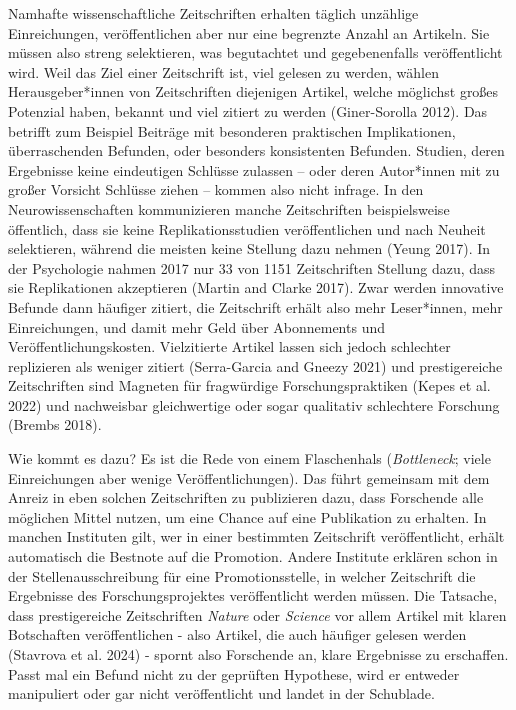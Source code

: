 \documentclass[
  letterpaper,
  DIV=11,
  numbers=noendperiod]{scrreprt}
\begin{document}
Namhafte wissenschaftliche Zeitschriften erhalten täglich unzählige
Einreichungen, veröffentlichen aber nur eine begrenzte Anzahl an
Artikeln. Sie müssen also streng selektieren, was begutachtet und
gegebenenfalls veröffentlicht wird. Weil das Ziel einer Zeitschrift ist,
viel gelesen zu werden, wählen Herausgeber*innen von Zeitschriften
diejenigen Artikel, welche möglichst großes Potenzial haben, bekannt und
viel zitiert zu werden (Giner-Sorolla 2012). Das betrifft zum Beispiel
Beiträge mit besonderen praktischen Implikationen, überraschenden
Befunden, oder besonders konsistenten Befunden. Studien, deren
Ergebnisse keine eindeutigen Schlüsse zulassen -- oder deren Autor*innen
mit zu großer Vorsicht Schlüsse ziehen -- kommen also nicht infrage. In
den Neurowissenschaften kommunizieren manche Zeitschriften
beispielsweise öffentlich, dass sie keine Replikationsstudien
veröffentlichen und nach Neuheit selektieren, während die meisten keine
Stellung dazu nehmen (Yeung 2017). In der Psychologie nahmen 2017 nur 33
von 1151 Zeitschriften Stellung dazu, dass sie Replikationen akzeptieren
(Martin and Clarke 2017). Zwar werden innovative Befunde dann häufiger
zitiert, die Zeitschrift erhält also mehr Leser*innen, mehr
Einreichungen, und damit mehr Geld über Abonnements und
Veröffentlichungskosten. Vielzitierte Artikel lassen sich jedoch
schlechter replizieren als weniger zitiert (Serra-Garcia and Gneezy
2021) und prestigereiche Zeitschriften sind Magneten für fragwürdige
Forschungspraktiken (Kepes et al. 2022) und nachweisbar gleichwertige
oder sogar qualitativ schlechtere Forschung (Brembs 2018).~

Wie kommt es dazu? Es ist die Rede von einem Flaschenhals
(\emph{Bottleneck}; viele Einreichungen aber wenige Veröffentlichungen).
Das führt gemeinsam mit dem Anreiz in eben solchen Zeitschriften zu
publizieren dazu, dass Forschende alle möglichen Mittel nutzen, um eine
Chance auf eine Publikation zu erhalten. In manchen Instituten gilt, wer
in einer bestimmten Zeitschrift veröffentlicht, erhält automatisch die
Bestnote auf die Promotion. Andere Institute erklären schon in der
Stellenausschreibung für eine Promotionsstelle, in welcher Zeitschrift
die Ergebnisse des Forschungsprojektes veröffentlicht werden müssen. Die
Tatsache, dass prestigereiche Zeitschriften \emph{Nature} oder
\emph{Science} vor allem Artikel mit klaren Botschaften veröffentlichen
- also Artikel, die auch häufiger gelesen werden (Stavrova et al. 2024)
- spornt also Forschende an, klare Ergebnisse zu erschaffen. Passt mal
ein Befund nicht zu der geprüften Hypothese, wird er entweder
manipuliert oder gar nicht veröffentlicht und landet in der Schublade.
\end{document}
